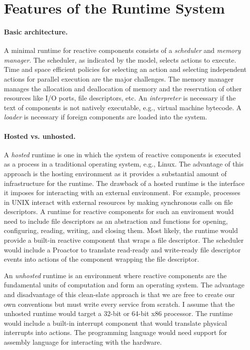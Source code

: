 \section{Features of the Runtime System \label{runtime}}

\paragraph{Basic architecture.}
A minimal runtime for reactive components consists of a \emph{scheduler} and \emph{memory manager}.
The scheduler, as indicated by the model, selects actions to execute.
Time and space efficient policies for selecting an action and selecting independent actions for parallel execution are the major challenges.
The memory manager manages the allocation and deallocation of memory and the reservation of other resources like I/O ports, file descriptors, etc.
An \emph{interpreter} is necessary if the text of components is not natively executable, e.g., virtual machine bytecode.
A \emph{loader} is necessary if foreign components are loaded into the system.

\paragraph{Hosted vs. unhosted.}
A \emph{hosted} runtime is one in which the system of reactive components is executed as a process in a traditional operating system, e.g., Linux.
The advantage of this approach is the hosting environment as it provides a substantial amount of infrastructure for the runtime.
The drawback of a hosted runtime is the interface it imposes for interacting with an external environment.
For example, processes in UNIX interact with external resources by making synchronous calls on file descriptors.
A runtime for reactive components for such an enviroment would need to include file descriptors as an abstraction and functions for opening, configuring, reading, writing, and closing them.
Most likely, the runtime would provide a built-in reactive component that wraps a file descriptor.
The scheduler would include a Proactor to translate read-ready and write-ready file descriptor events into actions of the component wrapping the file descriptor.

An \emph{unhosted} runtime is an environment where reactive components are the fundamental units of computation and form an operating system.
The advantage and disadvantage of this clean-slate approach is that we are free to create our own conventions but must write every service from scratch.
I assume that the unhosted runtime would target a 32-bit or 64-bit x86 processor.
The runtime would include a built-in interrupt component that would translate physical interrupts into actions.
The programming language would need support for assembly language for interacting with the hardware.

